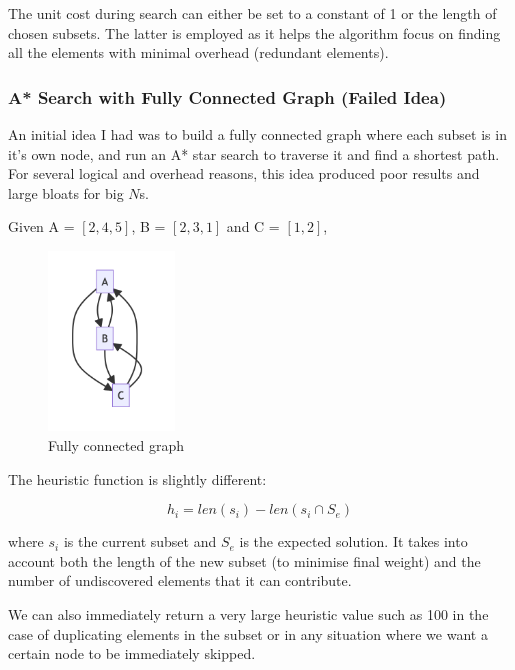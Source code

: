 The unit cost during search can either be set to a constant of 1 or the length of chosen subsets. The latter is employed as it helps the algorithm focus on finding all the elements with minimal overhead (redundant elements).

\subsubsection{A* Search with Fully Connected Graph (Failed Idea)}

An initial idea I had was to build a fully connected graph where each subset is in it's own node, and run an A* star search to traverse it and find a shortest path. For several logical and overhead reasons, this idea produced poor results and large bloats for big $N$s.

Given A = $[2, 4, 5]$, B = $[2, 3, 1]$ and C = $[1, 2]$,

\begin{figure}[h]
\centering
\includegraphics[width=0.3\textwidth]{images/astar.png}
\caption{Fully connected graph}
\label{fig:fully_connected_graph}
\end{figure}

The heuristic function is slightly different:

\begin{equation*}
h_i = len(s_i) - len(s_i \cap S_e)
\end{equation*}

where $s_i$ is the current subset and $S_e$ is the expected solution. It takes into account both the length of the new subset (to minimise final weight) and the number of undiscovered elements that it can contribute.

We can also immediately return a very large heuristic value such as 100 in the case of duplicating elements in the subset or in any situation where we want a certain node to be immediately skipped.

